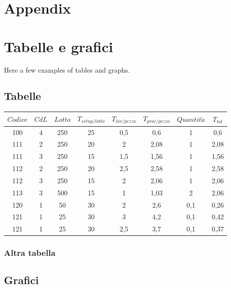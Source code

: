 \documentclass{FR16}
\begin{document}
\newpage
\section{Appendix}

\newpage

\section{Tabelle e grafici}
Here a few examples of tables and graphs.
\subsection{Tabelle}
\begin{center}
\begin{tabular}{c c c c c c c c}
\arrayrulecolor{Azzurro}
\hline
{\bfseries $Codice$} & {\bfseries $CdL$} & {\bfseries $Lotto$} & {\bfseries $T_{setup/lotto}$} & {\bfseries $T_{lav/pezzo}$} & {\bfseries $T_{proc/pezzo}$} & {\bfseries$Quantit\grave{a}$} & {\bfseries $T_{tot}$}\\
\hline
100 & 4 & 250 & 25 & 0,5 & 0,6 & 1 & 0,6\\
111 & 2 & 250 & 20 & 2 & 2,08 & 1 & 2,08 \\
111 & 3 & 250 & 15 & 1,5 & 1,56 & 1 & 1,56 \\
112 & 2 & 250 & 20 & 2,5 & 2,58 & 1 & 2,58 \\
112 & 3 & 250 & 15 & 2 & 2,06 & 1 & 2,06\\
113 & 3 & 500 & 15 & 1 & 1,03 & 2 & 2,06\\
120 & 1 & 50 & 30 & 2 & 2,6 & 0,1 & 0,26\\
121 & 1 & 25 & 30 & 3 & 4,2 & 0,1 & 0,42 \\
121 & 1 & 25 & 30 & 2,5 & 3,7 & 0,1 & 0,37 \\
\hline
\end{tabular}
\end{center}

\subsubsection{Altra tabella}
\subsection{Grafici}
\begin{center}

\end{center}
\end{document}
